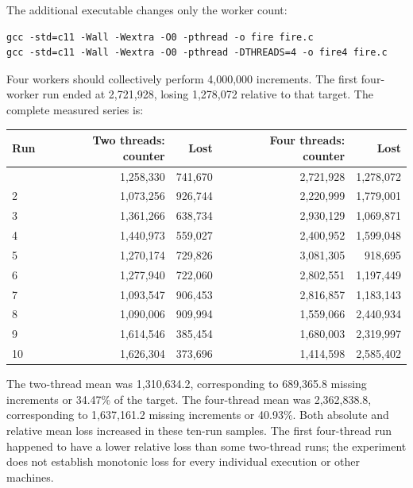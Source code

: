 \documentclass[12pt,a4paper]{article}
\begin{document}
The additional executable changes only the worker count:

\par\noindent\begin{minipage}{\linewidth}

\begin{lstlisting}
gcc -std=c11 -Wall -Wextra -O0 -pthread -o fire fire.c
gcc -std=c11 -Wall -Wextra -O0 -pthread -DTHREADS=4 -o fire4 fire.c
\end{lstlisting}

\end{minipage}\par

Four workers should collectively perform 4,000,000 increments. The first
four-worker run ended at 2,721,928, losing 1,278,072 relative to that
target. The complete measured series is:

{\def\LTcaptype{table} %
\begin{longtable}[]{@{}lrrrr@{}}
\toprule\noalign{}
Run & Two threads: counter & Lost & Four threads: counter & Lost \\
\midrule\noalign{}
\endhead
\bottomrule\noalign{}
\endlastfoot
1 & 1,258,330 & 741,670 & 2,721,928 & 1,278,072 \\
2 & 1,073,256 & 926,744 & 2,220,999 & 1,779,001 \\
3 & 1,361,266 & 638,734 & 2,930,129 & 1,069,871 \\
4 & 1,440,973 & 559,027 & 2,400,952 & 1,599,048 \\
5 & 1,270,174 & 729,826 & 3,081,305 & 918,695 \\
6 & 1,277,940 & 722,060 & 2,802,551 & 1,197,449 \\
7 & 1,093,547 & 906,453 & 2,816,857 & 1,183,143 \\
8 & 1,090,006 & 909,994 & 1,559,066 & 2,440,934 \\
9 & 1,614,546 & 385,454 & 1,680,003 & 2,319,997 \\
10 & 1,626,304 & 373,696 & 1,414,598 & 2,585,402 \\
\end{longtable}
}

The two-thread mean was 1,310,634.2, corresponding to 689,365.8 missing
increments or 34.47\% of the target. The four-thread mean was
2,362,838.8, corresponding to 1,637,161.2 missing increments or 40.93\%.
Both absolute and relative mean loss increased in these ten-run samples.
The first four-thread run happened to have a lower relative loss than
some two-thread runs; the experiment does not establish monotonic loss
for every individual execution or other machines.
\end{document}
